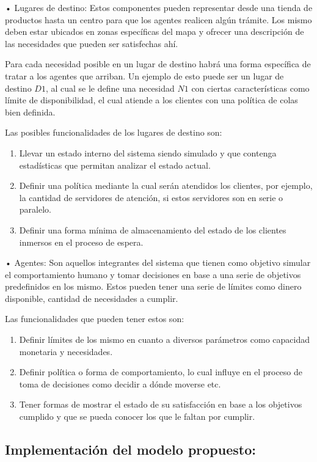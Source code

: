 \documentclass[12pt]{amsart}
\begin{document}
•	Lugares de destino: Estos componentes pueden representar desde una tienda de productos hasta un centro para que los agentes realicen algún trámite. Los mismo deben estar ubicados en zonas específicas del mapa y ofrecer una descripción de las necesidades que pueden ser satisfechas ahí. 

Para cada necesidad posible en un lugar de destino habrá una forma específica de tratar a los agentes que arriban. Un ejemplo de esto puede ser un lugar de destino $D1$, al cual se le define una necesidad $N1$ con ciertas características como límite de disponibilidad, el cual atiende a los clientes con una política de colas bien definida.

Las posibles funcionalidades de los lugares de destino son:
\begin {enumerate}
			\item Llevar un estado interno del sistema siendo simulado y que contenga estadísticas que permitan analizar el estado actual.
			\item Definir una política mediante la cual serán atendidos los clientes, por ejemplo, la cantidad de servidores de atención, si estos servidores son en serie o paralelo.
			\item Definir una forma mínima de almacenamiento del estado de los clientes inmersos en el proceso de espera.
\end {enumerate}

•	Agentes: Son aquellos integrantes del sistema que tienen como objetivo simular el comportamiento humano y tomar decisiones en base a una serie de objetivos predefinidos en los mismo. Estos pueden tener una serie de límites como dinero disponible, cantidad de necesidades a cumplir. 

Las funcionalidades que pueden tener estos son:
\begin {enumerate}
			\item Definir límites de los mismo en cuanto a diversos parámetros como capacidad monetaria y necesidades.
			\item Definir política o forma de comportamiento, lo cual influye en el proceso de toma de decisiones como decidir a dónde moverse etc.
			\item Tener formas de mostrar el estado de su satisfacción en base a los objetivos cumplido y que se pueda conocer los que le faltan por cumplir.
\end {enumerate}

\subsection{Implementación del modelo propuesto:} 
\end{document}
